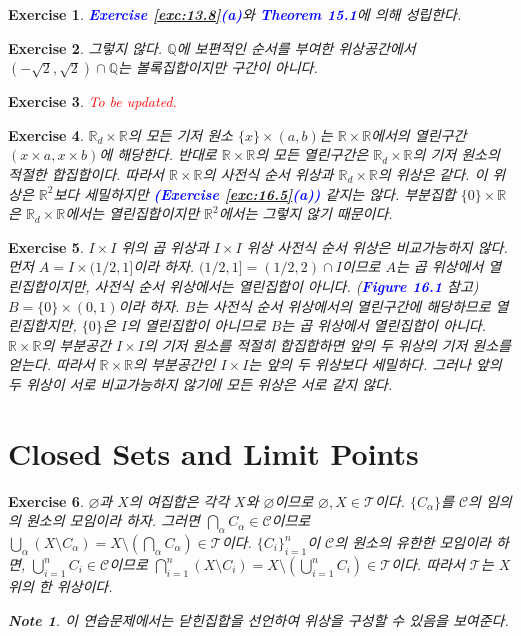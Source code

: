 \documentclass{article}
\newtheorem{exercise}{Exercise}[section]
\newtheorem*{note}{Note}
\newcommand{\Q}{\mathbb{Q}}
\newcommand{\R}{\mathbb{R}}
\begin{document}
\begin{exercise}
    \textcolor{blue}{\textbf{Exercise \ref{exc:13.8}(a)}}와 \textcolor{blue}{\textbf{Theorem 15.1}}에 의해 성립한다.
\end{exercise}

\begin{exercise}
    그렇지 않다. $\Q$에 보편적인 순서를 부여한 위상공간에서 $(-\sqrt2,\sqrt2)\cap\Q$는 볼록집합이지만 구간이 아니다.
\end{exercise}

\begin{exercise}
    \textcolor{red}{To be updated.}
\end{exercise}

\begin{exercise}
	\label{exc:16.9}
    $\R_d\times\R$의 모든 기저 원소 $\{x\}\times(a,b)$는 $\R\times \R$에서의 열린구간 $(x\times a,x\times b)$에 해당한다. 반대로 $\R\times\R$의 모든 열린구간은 $\R_d\times\R$의 기저 원소의 적절한 합집합이다. 따라서 $\R\times\R$의 사전식 순서 위상과 $\R_d\times\R$의 위상은 같다. 이 위상은 $\R^2$보다 세밀하지만 \textcolor{blue}{\textbf{(Exercise \ref{exc:16.5}(a))}} 같지는 않다. 부분집합 $\{0\}\times\R$은 $\R_d\times\R$에서는 열린집합이지만 $\R^2$에서는 그렇지 않기 때문이다.
\end{exercise}

\begin{exercise}
    $I\times I$ 위의 곱 위상과 $I\times I$ 위상 사전식 순서 위상은 비교가능하지 않다. 먼저 $A=I\times(1/2,1]$이라 하자. $(1/2,1]=(1/2,2)\cap I$이므로 $A$는 곱 위상에서 열린집합이지만, 사전식 순서 위상에서는 열린집합이 아니다. (\textcolor{blue}{\textbf{Figure 16.1}} 참고) $B=\{0\}\times(0,1)$이라 하자. $B$는 사전식 순서 위상에서의 열린구간에 해당하므로 열린집합지만, $\{0\}$은 $I$의 열린집합이 아니므로 $B$는 곱 위상에서 열린집합이 아니다. $\R\times\R$의 부분공간 $I\times I$의 기저 원소를 적절히 합집합하면 앞의 두 위상의 기저 원소를 얻는다. 따라서 $\R\times\R$의 부분공간인 $I\times I$는 앞의 두 위상보다 세밀하다. 그러나 앞의 두 위상이 서로 비교가능하지 않기에 모든 위상은 서로 같지 않다. 
\end{exercise}

\section{Closed Sets and Limit Points}

\begin{exercise}
    $\varnothing$과 $X$의 여집합은 각각 $X$와 $\varnothing$이므로 $\varnothing,X\in\mathcal{T}$이다. $\{C_\alpha\}$를 $\mathcal{C}$의 임의의 원소의 모임이라 하자. 그러면 $\bigcap_\alpha C_\alpha\in\mathcal{C}$이므로 $\bigcup_\alpha(X\setminus C_\alpha)=X\setminus(\bigcap_\alpha C_\alpha)\in\mathcal{T}$이다. $\{C_i\}_{i=1}^n$이 $\mathcal{C}$의 원소의 유한한 모임이라 하면, $\bigcup_{i=1}^nC_i\in\mathcal{C}$이므로 $\bigcap_{i=1}^n(X\setminus C_i)=X\setminus(\bigcup_{i=1}^nC_i)\in\mathcal{T}$이다. 따라서 $\mathcal{T}$는 $X$ 위의 한 위상이다.
    \begin{note}
        이 연습문제에서는 닫힌집합을 선언하여 위상을 구성할 수 있음을 보여준다.
    \end{note}
\end{exercise}
\end{document}
